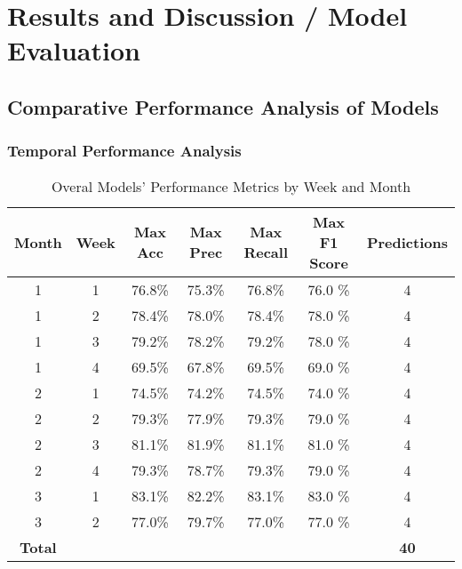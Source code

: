 \chapter{Results and Discussion / Model Evaluation}%


	\section{Comparative Performance Analysis of Models}

		\subsection{Temporal Performance Analysis}
			\begin{table}[H]
				\centering
				\begin{tabular}{|c|c|c|c|c|c|c|}
					\hline
					\textbf{Month} & \textbf{Week} & \textbf{Max Acc} & \textbf{Max Prec}
					& \textbf{Max Recall}
					& \textbf{Max F1 Score}
					& \textbf{Predictions}
					\\ \hline
					1 & 1 & 76.8\% & 75.3\% & 76.8\% &
					76.0
					\% & 4 \\ \hline
					1 & 2 & 78.4\% & 78.0\% & 78.4\% &
					78.0
					\% & 4 \\ \hline
					1 & 3 & 79.2\% & 78.2\% & 79.2\% &
					78.0
					\% & 4 \\ \hline
					1 & 4 & 69.5\% & 67.8\% & 69.5\% &
					69.0
					\% & 4 \\ \hline
					2 & 1 & 74.5\% & 74.2\% & 74.5\% &
					74.0
					\% & 4 \\ \hline
					2 & 2 & 79.3\% & 77.9\% & 79.3\% &
					79.0
					\% & 4 \\ \hline
					2 & 3 & 81.1\% & 81.9\% & 81.1\% &
					81.0
					\% & 4 \\ \hline
					2 & 4 & 79.3\% & 78.7\% & 79.3\% &
					79.0
					\% & 4 \\ \hline
					3 & 1 & 83.1\% & 82.2\% & 83.1\% &
					83.0
					\% & 4 \\ \hline
					3 & 2 & 77.0\% & 79.7\% & 77.0\% &
					77.0
					\% & 4 \\ \hline
					\textbf{Total} & & & & &
					& \textbf{40} \\ \hline
				\end{tabular}
				\caption{Overal Models' Performance Metrics by Week and Month}
				\label{tab:performance_metrics}
			\end{table}

